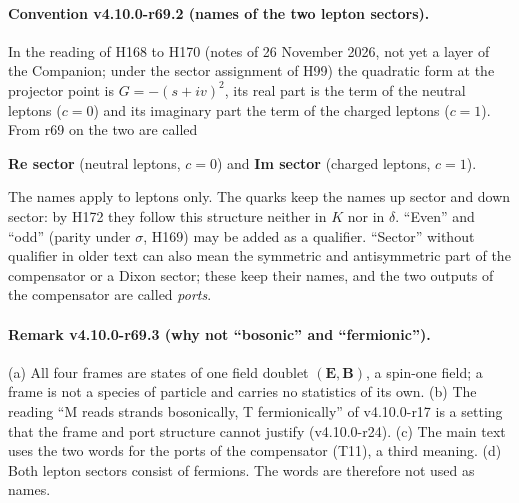 \paragraph{Convention v4.10.0-r69.2 (names of the two lepton sectors).}
In the reading of H168 to H170 (notes of 26 November 2026, not yet a layer of the Companion; under the sector assignment of H99) the
quadratic form at the projector point is \(G=-(s+iv)^2\), its real part is the term of the neutral leptons (\(c=0\)) and its imaginary part
the term of the charged leptons (\(c=1\)).  From r69 on the two are called
\begin{center}
\textbf{Re sector} (neutral leptons, \(c=0\)) \qquad and \qquad \textbf{Im sector} (charged leptons, \(c=1\)).
\end{center}
The names apply to leptons only.  The quarks keep the names up sector and down sector: by H172 they follow this structure neither in \(K\)
nor in \(\delta\).  ``Even'' and ``odd'' (parity under \(\sigma\), H169) may be added as a qualifier.  ``Sector'' without qualifier in older
text can also mean the symmetric and antisymmetric part of the compensator or a Dixon sector; these keep their names, and the two outputs of
the compensator are called \emph{ports}.

\paragraph{Remark v4.10.0-r69.3 (why not ``bosonic'' and ``fermionic'').}
(a) All four frames are states of one field doublet \((\mathbf E,\mathbf B)\), a spin-one field; a frame is not a species of particle and
carries no statistics of its own.  (b) The reading ``M reads strands bosonically, T fermionically'' of v4.10.0-r17 is a setting that the
frame and port structure cannot justify (v4.10.0-r24).  (c) The main text uses the two words for the ports of the compensator
(T11), a third meaning.  (d) Both lepton sectors consist of fermions.  The words are therefore not used as names.

